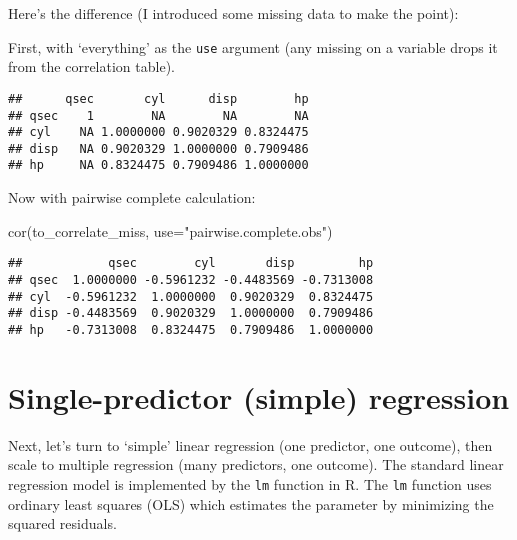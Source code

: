 \documentclass[
]{book}
\newenvironment{Shaded}{\begin{snugshade}}{\end{snugshade}}
\newcommand{\AttributeTok}[1]{\textcolor[rgb]{0.77,0.63,0.00}{#1}}
\newcommand{\CommentTok}[1]{\textcolor[rgb]{0.56,0.35,0.01}{\textit{#1}}}
\newcommand{\ConstantTok}[1]{\textcolor[rgb]{0.00,0.00,0.00}{#1}}
\newcommand{\DecValTok}[1]{\textcolor[rgb]{0.00,0.00,0.81}{#1}}
\newcommand{\FunctionTok}[1]{\textcolor[rgb]{0.00,0.00,0.00}{#1}}
\newcommand{\NormalTok}[1]{#1}
\newcommand{\OtherTok}[1]{\textcolor[rgb]{0.56,0.35,0.01}{#1}}
\newcommand{\SpecialCharTok}[1]{\textcolor[rgb]{0.00,0.00,0.00}{#1}}
\newcommand{\StringTok}[1]{\textcolor[rgb]{0.31,0.60,0.02}{#1}}
\begin{document}
Here's the difference (I introduced some missing data to make the point):

First, with `everything' as the \texttt{use} argument (any missing on a variable drops it from the correlation table).

\begin{Shaded}
\end{Shaded}

\begin{verbatim}
##      qsec       cyl      disp        hp
## qsec    1        NA        NA        NA
## cyl    NA 1.0000000 0.9020329 0.8324475
## disp   NA 0.9020329 1.0000000 0.7909486
## hp     NA 0.8324475 0.7909486 1.0000000
\end{verbatim}

Now with pairwise complete calculation:

\begin{Shaded}
\begin{Highlighting}[]
\FunctionTok{cor}\NormalTok{(to\_correlate\_miss, }\AttributeTok{use=}\StringTok{"pairwise.complete.obs"}\NormalTok{)}
\end{Highlighting}
\end{Shaded}

\begin{verbatim}
##            qsec        cyl       disp         hp
## qsec  1.0000000 -0.5961232 -0.4483569 -0.7313008
## cyl  -0.5961232  1.0000000  0.9020329  0.8324475
## disp -0.4483569  0.9020329  1.0000000  0.7909486
## hp   -0.7313008  0.8324475  0.7909486  1.0000000
\end{verbatim}

\hypertarget{single-predictor-simple-regression}{%
\section{Single-predictor (simple) regression}\label{single-predictor-simple-regression}}

Next, let's turn to `simple' linear regression (one predictor, one outcome), then scale to multiple regression (many predictors, one outcome). The standard linear regression model is implemented by the \texttt{lm} function in R. The \texttt{lm} function uses ordinary least squares (OLS) which estimates the parameter by minimizing the squared residuals.
\end{document}
